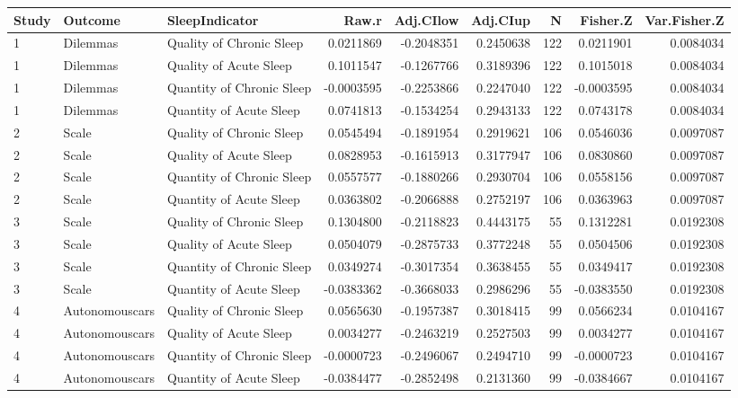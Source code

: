 \documentclass[
]{book}
\begin{document}
\begin{tabular}{l|l|l|r|r|r|r|r|r}
\hline
Study & Outcome & SleepIndicator & Raw.r & Adj.CIlow & Adj.CIup & N & Fisher.Z & Var.Fisher.Z\\
\hline
1 & Dilemmas & Quality of Chronic Sleep & 0.0211869 & -0.2048351 & 0.2450638 & 122 & 0.0211901 & 0.0084034\\
\hline
1 & Dilemmas & Quality of Acute Sleep & 0.1011547 & -0.1267766 & 0.3189396 & 122 & 0.1015018 & 0.0084034\\
\hline
1 & Dilemmas & Quantity of Chronic Sleep & -0.0003595 & -0.2253866 & 0.2247040 & 122 & -0.0003595 & 0.0084034\\
\hline
1 & Dilemmas & Quantity of Acute Sleep & 0.0741813 & -0.1534254 & 0.2943133 & 122 & 0.0743178 & 0.0084034\\
\hline
2 & Scale & Quality of Chronic Sleep & 0.0545494 & -0.1891954 & 0.2919621 & 106 & 0.0546036 & 0.0097087\\
\hline
2 & Scale & Quality of Acute Sleep & 0.0828953 & -0.1615913 & 0.3177947 & 106 & 0.0830860 & 0.0097087\\
\hline
2 & Scale & Quantity of Chronic Sleep & 0.0557577 & -0.1880266 & 0.2930704 & 106 & 0.0558156 & 0.0097087\\
\hline
2 & Scale & Quantity of Acute Sleep & 0.0363802 & -0.2066888 & 0.2752197 & 106 & 0.0363963 & 0.0097087\\
\hline
3 & Scale & Quality of Chronic Sleep & 0.1304800 & -0.2118823 & 0.4443175 & 55 & 0.1312281 & 0.0192308\\
\hline
3 & Scale & Quality of Acute Sleep & 0.0504079 & -0.2875733 & 0.3772248 & 55 & 0.0504506 & 0.0192308\\
\hline
3 & Scale & Quantity of Chronic Sleep & 0.0349274 & -0.3017354 & 0.3638455 & 55 & 0.0349417 & 0.0192308\\
\hline
3 & Scale & Quantity of Acute Sleep & -0.0383362 & -0.3668033 & 0.2986296 & 55 & -0.0383550 & 0.0192308\\
\hline
4 & Autonomouscars & Quality of Chronic Sleep & 0.0565630 & -0.1957387 & 0.3018415 & 99 & 0.0566234 & 0.0104167\\
\hline
4 & Autonomouscars & Quality of Acute Sleep & 0.0034277 & -0.2463219 & 0.2527503 & 99 & 0.0034277 & 0.0104167\\
\hline
4 & Autonomouscars & Quantity of Chronic Sleep & -0.0000723 & -0.2496067 & 0.2494710 & 99 & -0.0000723 & 0.0104167\\
\hline
4 & Autonomouscars & Quantity of Acute Sleep & -0.0384477 & -0.2852498 & 0.2131360 & 99 & -0.0384667 & 0.0104167\\

\end{tabular}
\end{document}
